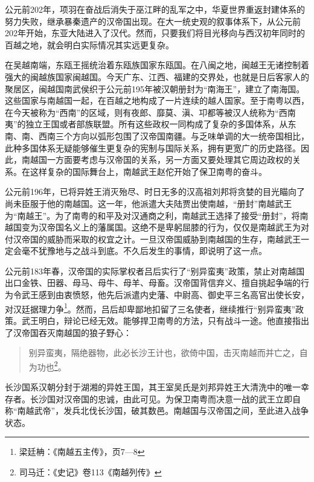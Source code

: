 \indent 公元前202年，项羽在奋战后消失于巫江畔的乱军之中，华夏世界重返封建体系的努力失败，继承暴秦遗产的汉帝国出现。在大一统史观的叙事体系下，从公元前202年开始，东亚大陆进入了汉代。然而，只要我们将目光移向与西汉初年同时的百越之地，就会明白实际情况其实远更复杂。

在吴越南端，东瓯王摇统治着东瓯族国家东瓯国。在八闽之地，闽越王无诸控制着强大的闽越族国家闽越国。今天广东、江西、福建的交界处，也就是日后客家人的聚居区，闽越国南武侯织于公元前195年被汉朝册封为“南海王”，建立了南海国。这些国家与南越国一起，在百越之地构成了一片连续的越人国家。至于南粤以西，在今天被称为“西南”的区域，则有夜郎、靡莫、滇、卭都等被汉人统称为“西南夷”的独立王国或者部族联盟。所有这些政权一同构成了复杂的多国体系，从东南、南、西南三个方向以弧形包围了汉帝国南疆。与乏味单调的大一统帝国相比，此种多国体系无疑能够催生更复杂的宪制与国际关系，拥有更宽广的历史路径。因此，南越国一方面要考虑与汉帝国的关系，另一方面又要处理其它周边政权的关系。在这样复杂的国际舞台上，南越武王赵佗开始了保卫南粤的奋斗。

公元前196年，已将异姓王消灭殆尽、时日无多的汉高祖刘邦将贪婪的目光瞄向了尚未臣服于他的南越国。这一年，他派遣大夫陆贾出使南越，“册封”南越武王为“南越王”。为了南粤的和平及对汉通商之利，南越武王选择了接受“册封”，将南越国变为汉帝国名义上的藩属国。这绝不是卑躬屈膝的行为，仅仅是南越武王为对付汉帝国的威胁而采取的权宜之计。一旦汉帝国威胁到南越国的生存，南越武王一定会毫不犹豫地与之战斗到底。不久后发生的事情，即说明了这一点。

公元前183年春，汉帝国的实际掌权者吕后实行了“别异蛮夷”政策，禁止对南越国出口金铁、田器、母马、母牛、母羊、母畜。汉帝国背信弃义、擅自挑起争端的行为令武王感到由衷愤怒，他先后派遣内史藩、中尉高、御史平三名高官出使长安，对汉廷据理力争\footnote{ 梁廷柟：《南越五主传》，页7—8}。然而，吕后却卑鄙地扣留了三名使者，继续推行“别异蛮夷”政策。武王明白，辩论已经无效。能够捍卫南粤的方法，只有战斗一途。他直接指出了汉帝国吞灭南越国的狼子野心：

\begin{quote}
	别异蛮夷，隔绝器物，此必长沙王计也，欲倚中国，击灭南越而并亡之，自为功也\footnote{司马迁：《史记》卷113《南越列传》}。
\end{quote}

长沙国系汉朝分封于湖湘的异姓王国，其王室吴氏是刘邦异姓王大清洗中的唯一幸存者。长沙国对汉帝国的忠诚，由此可见。为保卫南粤而决意一战的武王立即自称“南越武帝”，发兵北伐长沙国，破其数邑。南越国与汉帝国之间，至此进入战争状态。

